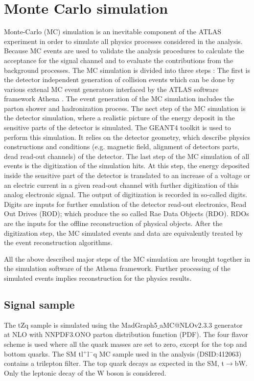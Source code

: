 \section{Monte Carlo simulation}
\label{sec:MC}
Monte-Carlo (MC) simulation is an inevitable component of the ATLAS experiment in order to simulate all physics processes considered in the analysis. Because MC events are used to validate the analysis procedures to calculate the acceptance for the signal channel and to evaluate the contributions from the background processes. The MC simulation is divided into three steps \cite{buckley2019monte}: The first is the detector independent generation of collision events which can be done by various extenal MC event generators interfaced by the ATLAS software framework Athena \cite{atlas_collaboration_2019_2641997} . The event generation of the MC simulation includes the parton shower and hadronization process. The nect step of the MC simulation is the detector simulation, where a realistic picture of the energy deposit in the sensitive parts of the detector is simulated. The GEANT4 \cite{GEANT4:2002zbu} toolkit is used to perform this simulation. It relies on the detector geometry, which describe physics constructions and conditions (e.g. magnetic field, alignment of detectors parts, dead read-out channels) of the detector. The last step of the MC simulation of all events is the digitization of the simulation hits. At this step, the energy deposited inside the sensitive part of the detector is translated to an increase of a voltage or an electric current in a given read-out channel with further digitization of this analog electronic signal. The output of digitization is recorded in so-called digits. Digits are inputs for further emulation of the detector read-out electronics, Read Out Drives (ROD); which produce the so called Rae Data Objects (RDO). RDOs are the inputs for the offline reconstruction of physical objects. After the digitization step, the MC simulated events and data are equivalently treated by the event reconstruction algorithms. 

All the above described major steps of the MC simulation are brought together in the simulation software of the Athena framework. Further processing of the simulated events implies reconstruction for the physics results. 


\subsection{Signal sample}
\label{subsec:Sig}
The tZq sample is simulated using the MadGraph5$\_$aMC@NLOv2.3.3 \cite{madgraph2014} generator at NLO with NNPDF3.ONO parton distribution function (PDF). The four flavor scheme is used where all the quark masses are set to zero, except for the top and bottom quarks. The SM tl$^{+}$l$^{-}$q MC sample used in the analysis (DSID:412063) contains a trilepton filter. The top quark decays as expected in the SM, t$\rightarrow$bW. Only the leptonic decay of the W boson is considered.  


